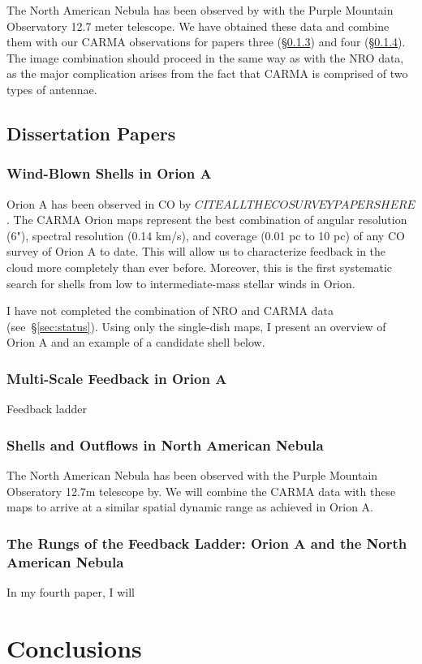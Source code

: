 The North American Nebula has been observed by \citet{Zhang14} with the Purple Mountain Observatory 12.7 meter telescope. We have obtained these data and combine them with our CARMA observations for papers three (\S\ref{sec:paper3}) and four (\S\ref{sec:paper4}). The image combination should proceed in the same way as with the NRO data, as the major complication arises from the fact that CARMA is comprised of two types of antennae.

    
    
    \subsection{Dissertation Papers}\label{sec:papers}
        \subsubsection{Wind-Blown Shells in Orion A}\label{sec:paper1}
Orion A has been observed in CO by $CITE ALL THE CO SURVEY PAPERS HERE$. The CARMA Orion maps represent the best combination of angular resolution (6"), spectral resolution (0.14 km/s), and coverage (0.01 pc to 10 pc) of any CO survey of Orion A to date. This will allow us to characterize feedback in the cloud more completely than ever before. Moreover, this is the first systematic search for shells from low to intermediate-mass stellar winds in Orion.
        
I have not completed the combination of NRO and CARMA data (see~\S\ref{sec:status}).  Using only the single-dish maps, I present an overview of Orion A and an example of a candidate shell below.
        
        \subsubsection{Multi-Scale Feedback in Orion A}\label{sec:paper2}
        Feedback ladder
        \subsubsection{Shells and Outflows in North American Nebula}\label{sec:paper3}
        The North American Nebula has been observed with the Purple Mountain Obseratory 12.7m telescope by. We will combine the CARMA data with these maps to arrive at a similar spatial dynamic range as achieved in Orion A.
        \subsubsection{The Rungs of the Feedback Ladder: Orion A and the North American Nebula}\label{sec:paper4}
        In my fourth paper, I will 
\section{Conclusions}\label{sec:conclusions}
    
    


  
  